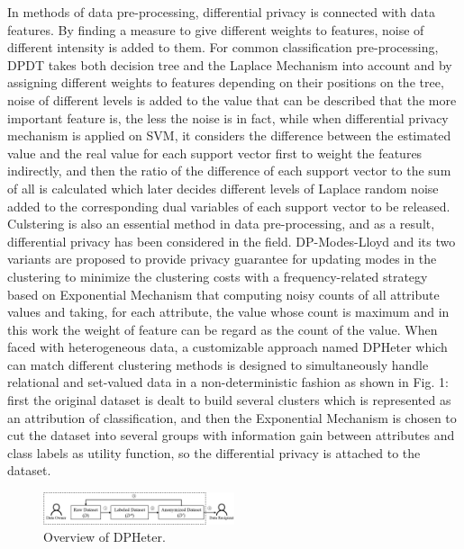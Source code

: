 \documentclass[conference]{IEEEtran}
\begin{document}
In methods of data pre-processing, differential privacy is connected with data features. By finding a measure to give different weights to features, noise of different intensity is added to them.  For common classification pre-processing, DPDT\cite{b3} takes both decision tree and the Laplace Mechanism into account and by assigning different weights to features depending on their positions on the tree, noise of different levels is added to the value that can be described that the more important feature is, the less the noise is in fact, while when differential privacy mechanism is applied on SVM\cite{b4}, it considers the difference between the estimated value and the real value for each support vector first to weight the features indirectly, and then the ratio of the difference of each support vector to the sum of all is calculated which later decides different levels of Laplace random noise added to the corresponding dual variables of each support vector to be released. Culstering is also an essential method in data pre-processing, and as a result, differential privacy has been considered in the field. DP-Modes-Lloyd and its two variants\cite{b5} are proposed to provide privacy guarantee for updating modes in the clustering to minimize the clustering costs with a frequency-related strategy based on Exponential Mechanism that computing noisy counts of all attribute values and taking, for each attribute, the value whose count is maximum and in this work the weight of feature can be regard as the count of the value. When faced with heterogeneous data, a customizable approach named DPHeter\cite{b6} which can match different clustering methods is designed to simultaneously handle relational and set-valued data in a non-deterministic fashion as shown in Fig. 1: first the original dataset is dealt to build several clusters which is represented as an attribution of classification, and then the Exponential Mechanism is chosen to cut the dataset into several groups with information gain between attributes and class labels as utility function, so the differential privacy is attached to the dataset.
\begin{figure}[htbp]
    \centerline{\includegraphics[width=0.5\textwidth,height=0.1\textwidth]{DPHeter.jpg}}
    \caption{Overview of DPHeter.}
    \label{fig1}
\end{figure}
\end{document}
